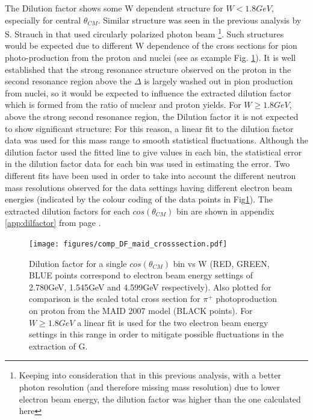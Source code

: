 The Dilution factor shows some W dependent structure for $W < 1.8GeV$, especially for central $\theta_{CM}$. Similar structure was seen in the previous analysis by S. Strauch in \cite{Strauch_2014} that used circularly polarized photon beam \footnote{Keeping into consideration that in this previous analysis, with a better photon resolution (and therefore missing mass resolution) due to lower electron beam energy, the dilution factor was higher than the one calculated here}. Such structures would be expected due to different W dependence of the cross sections for pion photo-production from the proton and nuclei (see as example Fig. \ref{fig:comparison_dilutionfactor}). It is well established that the strong resonance structure observed on the proton in the second resonance region above the $\Delta$  is largely washed out in pion production from nuclei, so it would be expected to influence the extracted dilution factor which is formed from the ratio of nuclear and proton yields. For $W \geq 1.8GeV$, above the strong second resonance region, the Dilution factor it is not expected to show significant structure: For this reason, a linear fit to the dilution factor data was used for this mass range to smooth statistical fluctuations. Although the dilution factor used the fitted line to give values in each bin, the statistical error in the dilution factor data for each bin was used in estimating the error. Two different fits have been used in order to take into account the different neutron mass resolutions observed for the data settings having different electron beam energies (indicated by the colour coding of the data points in Fig\ref{fig:comparison_dilutionfactor}). The extracted dilution factors for each $cos(\theta_{CM})$ bin are shown in  appendix \ref{app:dilfactor} from page \pageref{app:dilfactor}.  

\begin{figure}[H]
  \begin{center}
    \texttt{[image: figures/comp\_DF\_maid\_crosssection.pdf]} \\
    \caption{Dilution factor for a single $cos(\theta_{CM})$ bin vs W (RED, GREEN, BLUE points correspond to electron beam energy settings of 2.780GeV, 1.545GeV and 4.599GeV respectively). Also plotted for comparison is the scaled total cross section for $\pi^+$ photoproduction on proton from the MAID 2007 model \cite{MAID_2007} (BLACK points). For $W \geq 1.8GeV$ a linear fit is used for the two electron beam energy settings in this range in order to mitigate possible fluctuations in the extraction of G.}
    \label{fig:comparison_dilutionfactor}
  \end{center}
\end{figure}


